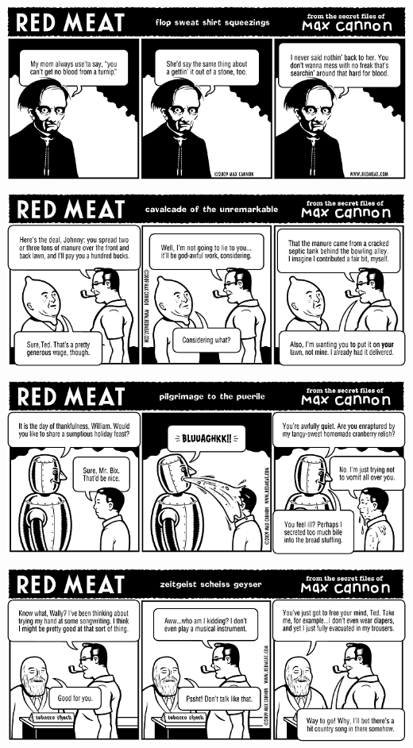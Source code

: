 \documentclass[a4paper,twoside,11pt]{article}
\begin{document}
\includegraphics[width=\textwidth]{redmeat_2009-11-17.png}



\includegraphics[width=\textwidth]{redmeat_2009-11-24.png}



\includegraphics[width=\textwidth]{redmeat_2009-12-01.png}



\includegraphics[width=\textwidth]{redmeat_2009-12-08.png}
\end{document}
